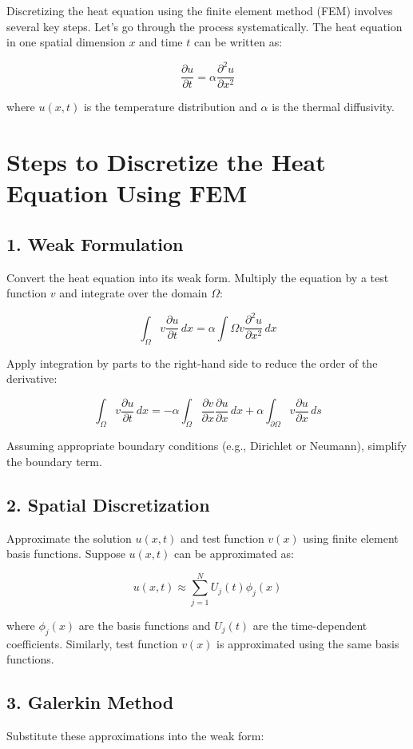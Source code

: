 \documentclass{article}
\begin{document}
Discretizing the heat equation using the finite element method (FEM) involves several key steps. Let's go through the process systematically. The heat equation in one spatial dimension \(x\) and time \(t\) can be written as:

\[
\frac{\partial u}{\partial t} = \alpha \frac{\partial^2 u}{\partial x^2}
\]

where \(u(x,t)\) is the temperature distribution and \(\alpha\) is the thermal diffusivity.

\section*{Steps to Discretize the Heat Equation Using FEM}

\subsection*{1. Weak Formulation}
Convert the heat equation into its weak form. Multiply the equation by a test function \(v\) and integrate over the domain \(\Omega\):

\[
\int_{\Omega} v \frac{\partial u}{\partial t} \, dx = \alpha \int{\Omega} v \frac{\partial^2 u}{\partial x^2} \, dx
\]

Apply integration by parts to the right-hand side to reduce the order of the derivative:

\[
\int_{\Omega} v \frac{\partial u}{\partial t} \, dx = -\alpha \int_{\Omega} \frac{\partial v}{\partial x} \frac{\partial u}{\partial x} \, dx + \alpha \int_{\partial \Omega} v \frac{\partial u}{\partial x} \, ds
\]

Assuming appropriate boundary conditions (e.g., Dirichlet or Neumann), simplify the boundary term.

\subsection*{2. Spatial Discretization}
Approximate the solution \(u(x,t)\) and test function \(v(x)\) using finite element basis functions. Suppose \(u(x,t)\) can be approximated as:

\[
u(x,t) \approx \sum_{j=1}^{N} U_j(t) \phi_j(x)
\]

where \(\phi_j(x)\) are the basis functions and \(U_j(t)\) are the time-dependent coefficients. Similarly, test function \(v(x)\) is approximated using the same basis functions.

\subsection*{3. Galerkin Method}
Substitute these approximations into the weak form:
\end{document}
